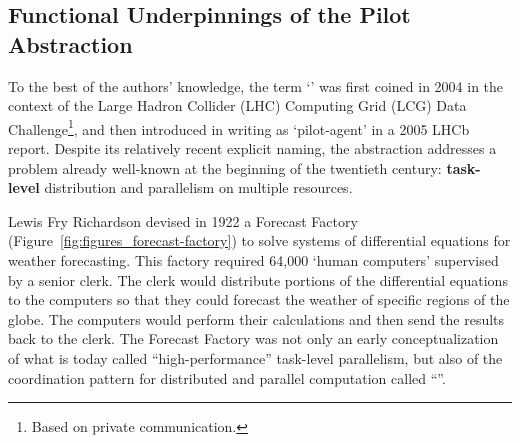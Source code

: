 \documentclass{sig-alternate}
\begin{document}

  


\subsection{Functional Underpinnings of the Pilot Abstraction}
\label{sec:histabstr}

To the best of the authors' knowledge, the term `\pilot' was first coined in
2004 in the context of the Large Hadron Collider (LHC) Computing Grid (LCG) Data
Challenge\footnote{Based on private communication.}, and then introduced in
writing as `pilot-agent' in a 2005 LHCb report\cite{lhcb2005}. Despite its
relatively recent explicit naming, the \pilot abstraction addresses a problem
already well-known at the beginning of the twentieth century: {\bf task-level}
distribution and parallelism on multiple resources.

Lewis Fry Richardson devised in 1922 a Forecast Factory
(Figure~\ref{fig:figures_forecast-factory}) to solve systems of differential
equations for weather forecasting. This factory required 64,000 `human
computers' supervised by a senior clerk. The clerk would distribute portions of
the differential equations to the computers so that they could forecast the
weather of specific regions of the globe. The computers would perform their
calculations and then send the results back to the clerk. The Forecast Factory
was not only an early conceptualization of what is today called
``high-performance'' task-level parallelism, but also of the coordination
pattern for distributed and parallel computation called ``\MW''.
\end{document}
